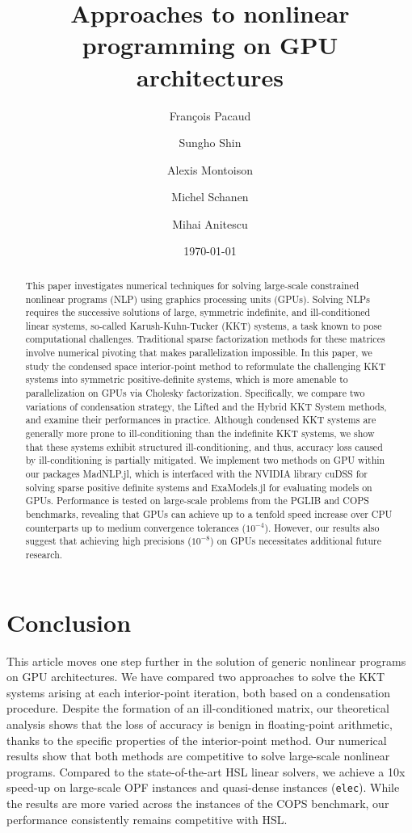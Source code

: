 \documentclass[smallextended]{svjour3}
\title{Approaches to nonlinear programming on GPU architectures}
\author{François Pacaud \and
Sungho Shin \and
Alexis Montoison \and
Michel Schanen \and
Mihai Anitescu
}
\date{\today}
\begin{document}
\maketitle

\begin{abstract}
  This paper investigates numerical techniques for solving large-scale constrained nonlinear programs (NLP) using graphics processing units (GPUs). 
  Solving NLPs requires the successive solutions of large, symmetric indefinite, and ill-conditioned linear systems, so-called Karush-Kuhn-Tucker (KKT) systems, a task known to pose computational challenges.
  Traditional sparse factorization methods for these matrices involve numerical pivoting that makes parallelization impossible.
  In this paper, we study the condensed space interior-point method to reformulate the challenging KKT systems into symmetric positive-definite systems, which is more amenable to parallelization on GPUs via Cholesky factorization.
  Specifically, we compare two variations of condensation strategy, the Lifted and the Hybrid KKT System methods, and examine their performances in practice.
  Although condensed KKT systems are generally more prone to ill-conditioning than the indefinite KKT systems, we show that these systems exhibit structured ill-conditioning, and thus, accuracy loss caused by ill-conditioning is partially mitigated.
  We implement two methods on GPU within our packages MadNLP.jl, which is interfaced with the NVIDIA library cuDSS for solving sparse positive definite systems and ExaModels.jl for evaluating models on GPUs.
  Performance is tested on large-scale problems from the PGLIB and COPS benchmarks, revealing that GPUs can achieve up to a tenfold speed increase over CPU counterparts up to medium convergence tolerances ($10^{-4}$).
  However, our results also suggest that achieving high precisions ($10^{-8}$) on GPUs necessitates additional future research.
\end{abstract}










\section{Conclusion}
This article moves one step further in the solution of generic nonlinear
programs on GPU architectures. We have compared two approaches
to solve the KKT systems arising at each interior-point iteration, both
based on a condensation procedure.
Despite the formation of an ill-conditioned matrix, our theoretical analysis shows that the loss of accuracy is benign in floating-point arithmetic, thanks to the specific properties of the interior-point method.
Our numerical results show that both methods are competitive to solve large-scale
nonlinear programs.
Compared to the state-of-the-art HSL linear solvers, we achieve a 10x speed-up on large-scale OPF instances and quasi-dense instances (\texttt{elec}). While the results are more varied across the instances of the COPS benchmark, our performance consistently remains competitive with HSL.
\end{document}
